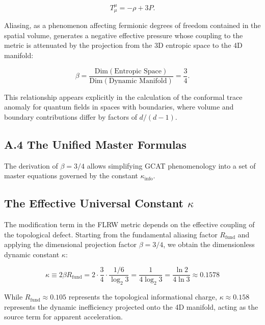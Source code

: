 \documentclass[12pt, a4paper]{article}
\theoremstyle{plain}
\theoremstyle{definition}
\begin{document}
\begin{equation}
T^\mu_\mu = -\rho + 3P.
\end{equation}

Aliasing, as a phenomenon affecting fermionic degrees of freedom contained in the spatial volume, generates a negative effective pressure whose coupling to the metric is attenuated by the projection from the 3D entropic space to the 4D manifold:

\begin{equation}
\beta = \frac{\text{Dim}(\text{Entropic Space})}{\text{Dim}(\text{Dynamic Manifold})} = \frac{3}{4}.
\end{equation}

This relationship appears explicitly in the calculation of the conformal trace anomaly for quantum fields in spaces with boundaries, where volume and boundary contributions differ by factors of $d/(d-1)$.


\subsection{A.4 The Unified Master Formulas}
\label{app:master_formulas}

The derivation of $\beta = 3/4$ allows simplifying GCAT phenomenology into a set of master equations governed by the constant $\kappa_{\text{info}}$.

\subsection{The Effective Universal Constant $\kappa$}
The modification term in the FLRW metric depends on the effective coupling of the topological defect. Starting from the fundamental aliasing factor $R_{\text{fund}}$ and applying the dimensional projection factor $\beta=3/4$, we obtain the dimensionless dynamic constant $\kappa$:

\begin{equation}
\kappa \equiv 2\beta R_{\text{fund}} = 2 \cdot \frac{3}{4} \cdot \frac{1/6}{\log_2 3} = \frac{1}{4 \log_2 3} = \frac{\ln 2}{4 \ln 3} \approx 0.1578
\end{equation}

While $R_{\text{fund}} \approx 0.105$ represents the topological informational charge, $\kappa \approx 0.158$ represents the dynamic inefficiency projected onto the 4D manifold, acting as the source term for apparent acceleration.
\end{document}
